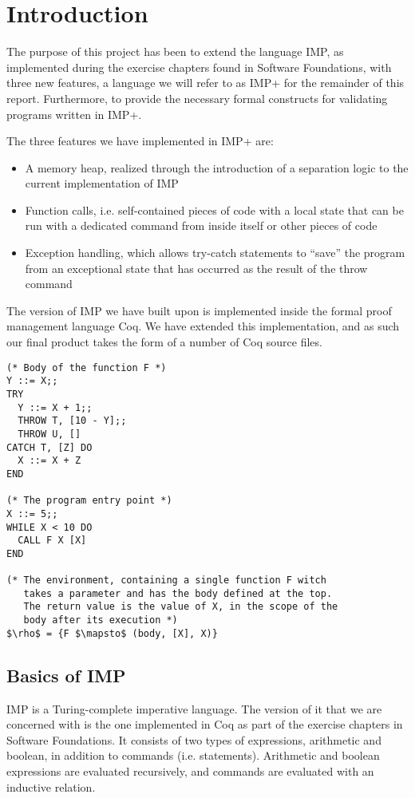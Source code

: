 
\section{Introduction}
The purpose of this project has been to extend the language IMP, as implemented during the exercise chapters found in Software Foundations, with three new features, a language we will refer to as IMP+ for the remainder of this report. Furthermore, to provide the necessary formal constructs for validating programs written in IMP+.

The three features we have implemented in IMP+ are:
\begin{itemize}
\item A memory heap, realized through the introduction of a separation logic to the current implementation of IMP
\item Function calls, i.e. self-contained pieces of code with a local state that can be run with a dedicated command from inside itself or other pieces of code
\item Exception handling, which allows try-catch statements to “save” the program from an exceptional state that has occurred as the result of the throw command
\end{itemize}

The version of IMP we have built upon is implemented inside the formal proof management language Coq. We have extended this implementation, and as such our final product takes the form of a number of Coq source files.

\begin{lstlisting}[mathescape=true,keepspaces=true,label=lst:imp-plus-ex,caption=A program written in IMP+ demonstrating assignment and throw/catch.]
(* Body of the function F *)
Y ::= X;;
TRY
  Y ::= X + 1;;
  THROW T, [10 - Y];;
  THROW U, []
CATCH T, [Z] DO
  X ::= X + Z
END

(* The program entry point *)
X ::= 5;;
WHILE X < 10 DO
  CALL F X [X]
END

(* The environment, containing a single function F witch
   takes a parameter and has the body defined at the top.
   The return value is the value of X, in the scope of the 
   body after its execution *)
$\rho$ = {F $\mapsto$ (body, [X], X)}
\end{lstlisting}

\subsection{Basics of IMP}
IMP is a Turing-complete imperative language. The version of it that we are concerned with is the one implemented in Coq as part of the exercise chapters in Software Foundations. It consists of two types of expressions, arithmetic and boolean, in addition to commands (i.e. statements). Arithmetic and boolean expressions are evaluated recursively, and commands are evaluated with an inductive relation.

